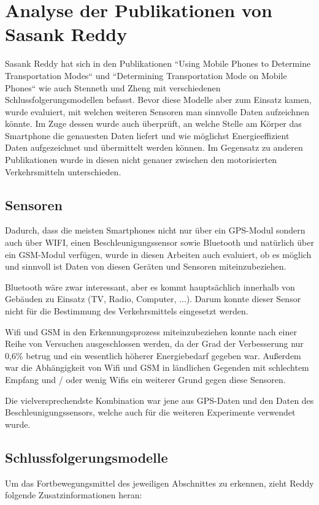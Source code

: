 \section{Analyse der Publikationen von Sasank Reddy}
Sasank Reddy hat sich in den Publikationen ``Using Mobile Phones to Determine Transportation Modes`` \cite{reddy_using_2010} und ``Determining Transportation Mode on Mobile Phones`` \cite{reddy_determining_2008} wie auch Stenneth und Zheng mit verschiedenen Schlussfolgerungsmodellen befasst. Bevor diese Modelle aber zum Einsatz kamen, wurde evaluiert, mit welchen weiteren Sensoren man sinnvolle Daten aufzeichnen könnte. Im Zuge dessen wurde auch überprüft, an welche Stelle am Körper das Smartphone die genauesten Daten liefert und wie möglichst Energieeffizient Daten aufgezeichnet und übermittelt werden können. Im Gegensatz zu anderen Publikationen wurde in diesen nicht genauer zwischen den motorisierten Verkehrsmitteln unterschieden.

\subsection{Sensoren}
Dadurch, dass die meisten Smartphones nicht nur über ein GPS-Modul sondern auch über WIFI, einen Beschleunigungssensor sowie Bluetooth und natürlich über ein GSM-Modul verfügen, wurde in diesen Arbeiten auch evaluiert, ob es möglich und sinnvoll ist Daten von diesen Geräten und Sensoren miteinzubeziehen. 

Bluetooth  wäre zwar interessant, aber es kommt hauptsächlich innerhalb von Gebäuden zu Einsatz (TV, Radio, Computer, ...). Darum konnte dieser Sensor nicht für die Bestimmung des Verkehrsmittels eingesetzt werden. 

Wifi und GSM in den Erkennungsprozess miteinzubeziehen konnte nach einer Reihe von Versuchen ausgeschlossen werden, da der Grad der Verbesserung nur 0,6\% betrug und ein wesentlich höherer Energiebedarf gegeben war. Außerdem war die Abhängigkeit von Wifi und GSM in ländlichen Gegenden mit schlechtem Empfang und / oder wenig Wifis ein weiterer Grund gegen diese Sensoren.

Die vielversprechendste Kombination war jene aus GPS-Daten und den Daten des Beschleunigungssensors, welche auch  für die weiteren Experimente verwendet wurde.

\subsection{Schlussfolgerungsmodelle}
Um das Fortbewegungsmittel des jeweiligen Abschnittes zu erkennen, zieht Reddy folgende Zusatzinformationen heran:

